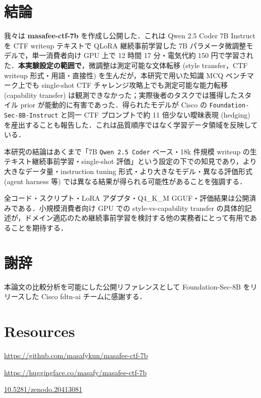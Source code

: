 \documentclass[10pt,twocolumn,a4paper]{ltjsarticle}
\begin{document}
\section{結論}

我々は \textbf{masafee-ctf-7b} を作成し公開した．これは Qwen 2.5 Coder 7B Instruct を CTF writeup テキストで QLoRA 継続事前学習した 7B パラメータ微調整モデルで，単一消費者向け GPU 上で 12 時間 17 分・電気代約 150 円で学習された．\textbf{本実験設定の範囲で}，微調整は測定可能な文体転移 (style transfer，CTF writeup 形式・用語・直接性) を生んだが，本研究で用いた知識 MCQ ベンチマーク上でも single-shot CTF チャレンジ攻略上でも測定可能な能力転移 (capability transfer) は観測できなかった；実際後者のタスクでは獲得したスタイル prior が能動的に有害であった．得られたモデルが Cisco の \texttt{Foundation-Sec-8B-Instruct} と同一 CTF プロンプトで約 11 倍少ない曖昧表現 (hedging) を産出することも報告した．これは品質順序ではなく学習データ領域を反映している．

本研究の結論はあくまで「7B \texttt{Qwen 2.5 Coder} ベース・18k 件規模 writeup の生テキスト継続事前学習・single-shot 評価」という設定の下での知見であり，より大きなデータ量・instruction tuning 形式・より大きなモデル・異なる評価形式 (agent harness 等) では異なる結果が得られる可能性があることを強調する．

全コード・スクリプト・LoRA アダプタ・Q4{\_}K{\_}M GGUF・評価結果は公開済みである．小規模消費者向け GPU での style-vs-capability transfer の具体的記述が，ドメイン適応のため継続事前学習を検討する他の実務者にとって有用であることを期待する．

\section*{謝辞}

本論文の比較分析を可能にした公開リファレンスとして Foundation-Sec-8B をリリースした Cisco fdtn-ai チームに感謝する．

\section*{Resources}

\begin{description}[leftmargin=0pt,labelindent=0pt]
\item[Code] \url{https://github.com/masafykun/masafee-ctf-7b}
\item[Model] \url{https://huggingface.co/masafy/masafee-ctf-7b}
\item[Archive (DOI)] \href{https://doi.org/10.5281/zenodo.20413081}{10.5281/zenodo.20413081}
\end{description}
\end{document}
